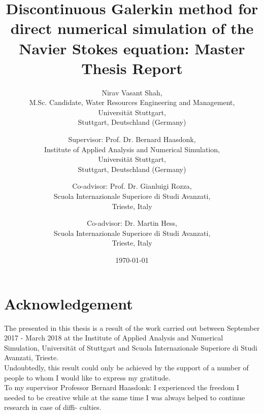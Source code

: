 \documentclass[a4paper,openany]{book}
\begin{document}
\begin{center}

\title{Discontinuous Galerkin method for direct numerical simulation of the Navier Stokes equation: Master Thesis Report}


\author{Nirav Vasant Shah, \\M.Sc. Candidate, Water Resources Engineering and Management, \\Universit\"at Stuttgart, \\Stuttgart, Deutschland (Germany)\\ 
\and Supervisor: Prof. Dr. Bernard Haasdonk,\\ Institute of Applied Analysis and Numerical Simulation, \\Universit\"at Stuttgart,\\ Stuttgart, Deutschland (Germany)\\ \and Co-advisor: Prof. Dr. Gianluigi Rozza,\\ Scuola Internazionale Superiore di Studi Avanzati, \\Trieste, Italy \\ \and Co-advisor: Dr. Martin Hess,\\ Scuola Internazionale Superiore di Studi Avanzati, \\Trieste, Italy }
\date{\today}
\maketitle

\end{center}

\noindent

\section{Acknowledgement}

The  presented in this thesis is a result of the work carried out between September 2017 - March 2018 at the Institute of Applied Analysis and Numerical Simulation, Universit\"at of Stuttgart and Scuola Internazionale Superiore di Studi Avanzati, Trieste. \\

Undoubtedly, this result could only be achieved by the support of a number of people to whom I would
like to express my gratitude.\\

To my supervisor Professor Bernard Haasdonk: I experienced the freedom I needed to be
creative while at the same time I was always helped to continue research in case of diffi-
culties. \\
\end{document}
